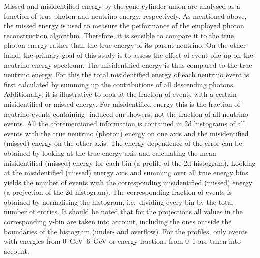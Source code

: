 Missed and misidentified energy by the cone-cylinder union are analysed as a function of true photon and neutrino energy, respectively.
As mentioned above, the missed energy is used to measure the performance of the employed photon reconstruction algorithm.
Therefore, it is sensible to compare it to the true photon energy rather than the true energy of its parent neutrino.
On the other hand, the primary goal of this study is to assess the effect of event pile-up on the neutrino energy spectrum.
The misidentified energy is thus compared to the true neutrino energy.
For this the total misidentified energy of each neutrino event is first calculated by summing up the contributions of all descending \Pgpz photons.
Additionally, it is illustrative to look at the fraction of events with a certain misidentified or missed energy.
For misidentified energy this is the fraction of neutrino events containing \Pgpz-induced \gls{em} showers, not the fraction of all neutrino events.
All the aforementioned information is contained in \gls{2d} histograms of all events with the true neutrino (photon) energy on one axis and the misidentified (missed) energy on the other axis.
The energy dependence of the error can be obtained by looking at the true energy axis and calculating the mean misidentified (missed) energy for each bin (a profile of the \gls{2d} histogram).
Looking at the misidentified (missed) energy axis and summing over all true energy bins yields the number of events with the corresponding misidentified (missed) energy (a projection of the \gls{2d} histogram).
The corresponding fraction of events is obtained by normalising the histogram, i.e.\ dividing every bin by the total number of entries.
It should be noted that for the projections all values in the corresponding y-bin are taken into account, including the ones outside the boundaries of the histogram (under- and overflow).
For the profiles, only events with energies from \SIrange{0}{6}{\giga\electronvolt} or energy fractions from \numrange{0}{1} are taken into account.

